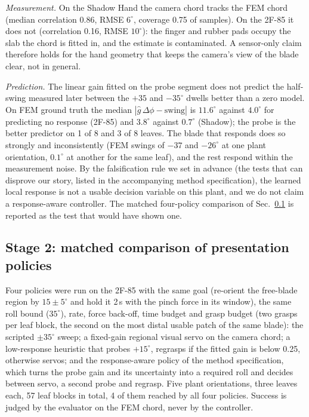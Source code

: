 \documentclass[letterpaper, 10 pt, conference]{ieeeconf}
\begin{document}
\emph{Measurement.} On the Shadow Hand the camera chord tracks the FEM chord (median
correlation 0.86, RMSE $6^\circ$, coverage 0.75 of samples). On the 2F-85 it does not
(correlation 0.16, RMSE $10^\circ$): the finger and rubber pads occupy the slab the chord
is fitted in, and the estimate is contaminated. A sensor-only claim therefore holds for the
hand geometry that keeps the camera's view of the blade clear, not in general.

\emph{Prediction.} The linear gain fitted on the probe segment does not predict the
half-swing measured later between the $+35$ and $-35^\circ$ dwells better than a zero
model. On FEM ground truth the median $|\hat g\,\Delta\phi - \text{swing}|$ is $11.6^\circ$
against $4.0^\circ$ for predicting no response (2F-85) and $3.8^\circ$ against $0.7^\circ$
(Shadow); the probe is the better predictor on 1 of 8 and 3 of 8 leaves. The blade that
responds does so strongly and inconsistently (FEM swings of $-37$ and $-26^\circ$ at one
plant orientation, $0.1^\circ$ at another for the same leaf), and the rest respond
within the measurement noise. By the falsification rule we set in advance
(the tests that can disprove our story, listed in the accompanying method specification), the learned local response is not a usable decision variable on
this plant, and we do not claim a response-aware controller. The matched four-policy
comparison of Sec.~\ref{sec:stage2} is reported as the test that would have shown one.

\subsection{Stage 2: matched comparison of presentation policies}\label{sec:stage2}
Four policies were run on the 2F-85 with the same goal (re-orient the free-blade region by
$15\pm5^\circ$ and hold it 2\,s with the pinch force in its window), the same roll bound
($35^\circ$), rate, force back-off, time budget and grasp budget (two grasps per leaf block,
the second on the most distal usable patch of the same blade): the scripted $\pm35^\circ$
sweep; a fixed-gain regional visual servo on the camera chord; a low-response heuristic that
probes $+15^\circ$, regrasps if the fitted gain is below 0.25, otherwise servos; and the
response-aware policy of the method specification, which turns the probe gain and its
uncertainty into a required roll and decides between servo, a second probe and regrasp.
Five plant orientations, three leaves each, 57 leaf blocks in total, 4 of them reached by all
four policies. Success is judged by the evaluator on the FEM chord, never by the controller.
\end{document}
